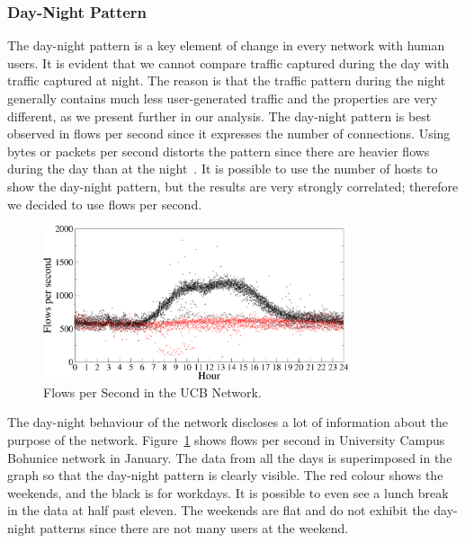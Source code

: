 \subsubsection{Day-Night Pattern}

The day-night pattern is a key element of change in every network with human users. It is evident that we cannot compare traffic captured during the day with traffic captured at night. The reason is that the traffic pattern during the night generally contains much less user-generated traffic and the properties are very different, as we present further in our analysis. The day-night pattern is best observed in flows per second since it expresses the number of connections. Using bytes or packets per second distorts the pattern since there are heavier flows during the day than at the night~\cite{Quan-2010-Characteristics}. It is possible to use the number of hosts to show the day-night pattern, but the results are very strongly correlated; therefore we decided to use flows per second.

\begin{figure}[!t]
        \begin{center}
                \includegraphics[width=0.8\textwidth]{figures/paper-characterization/flows-ukb-jan}
                \caption{Flows per Second in the UCB Network.}
                \label{fig:characterization-flows-ukb-jan}
        \end{center}
\end{figure}

The day-night behaviour of the network discloses a lot of information about the purpose of the network. Figure~\ref{fig:characterization-flows-ukb-jan} shows flows per second in University Campus Bohunice network in January. The data from all the days is superimposed in the graph so that the day-night pattern is clearly visible. The red colour shows the weekends, and the black is for workdays. It is possible to even see a lunch break in the data at half past eleven. The weekends are flat and do not exhibit the day-night patterns since there are not many users at the weekend.

